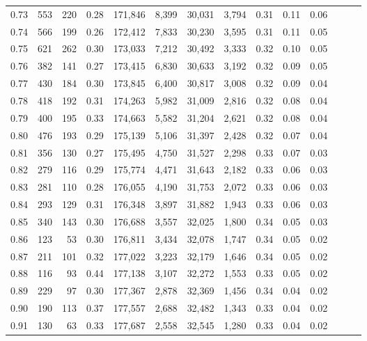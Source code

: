 \begin{tabular}{rrrrrrrrrrrrrr}
0.73 &    553 &  220 &  0.28 &  171,846 &    8,399 &  30,031 &   3,794 &  0.31 &  0.11 &      0.06 \\
0.74 &    566 &  199 &  0.26 &  172,412 &    7,833 &  30,230 &   3,595 &  0.31 &  0.11 &      0.05 \\
0.75 &    621 &  262 &  0.30 &  173,033 &    7,212 &  30,492 &   3,333 &  0.32 &  0.10 &      0.05 \\
0.76 &    382 &  141 &  0.27 &  173,415 &    6,830 &  30,633 &   3,192 &  0.32 &  0.09 &      0.05 \\
0.77 &    430 &  184 &  0.30 &  173,845 &    6,400 &  30,817 &   3,008 &  0.32 &  0.09 &      0.04 \\
0.78 &    418 &  192 &  0.31 &  174,263 &    5,982 &  31,009 &   2,816 &  0.32 &  0.08 &      0.04 \\
0.79 &    400 &  195 &  0.33 &  174,663 &    5,582 &  31,204 &   2,621 &  0.32 &  0.08 &      0.04 \\
0.80 &    476 &  193 &  0.29 &  175,139 &    5,106 &  31,397 &   2,428 &  0.32 &  0.07 &      0.04 \\
0.81 &    356 &  130 &  0.27 &  175,495 &    4,750 &  31,527 &   2,298 &  0.33 &  0.07 &      0.03 \\
0.82 &    279 &  116 &  0.29 &  175,774 &    4,471 &  31,643 &   2,182 &  0.33 &  0.06 &      0.03 \\
0.83 &    281 &  110 &  0.28 &  176,055 &    4,190 &  31,753 &   2,072 &  0.33 &  0.06 &      0.03 \\
0.84 &    293 &  129 &  0.31 &  176,348 &    3,897 &  31,882 &   1,943 &  0.33 &  0.06 &      0.03 \\
0.85 &    340 &  143 &  0.30 &  176,688 &    3,557 &  32,025 &   1,800 &  0.34 &  0.05 &      0.03 \\
0.86 &    123 &   53 &  0.30 &  176,811 &    3,434 &  32,078 &   1,747 &  0.34 &  0.05 &      0.02 \\
0.87 &    211 &  101 &  0.32 &  177,022 &    3,223 &  32,179 &   1,646 &  0.34 &  0.05 &      0.02 \\
0.88 &    116 &   93 &  0.44 &  177,138 &    3,107 &  32,272 &   1,553 &  0.33 &  0.05 &      0.02 \\
0.89 &    229 &   97 &  0.30 &  177,367 &    2,878 &  32,369 &   1,456 &  0.34 &  0.04 &      0.02 \\
0.90 &    190 &  113 &  0.37 &  177,557 &    2,688 &  32,482 &   1,343 &  0.33 &  0.04 &      0.02 \\
0.91 &    130 &   63 &  0.33 &  177,687 &    2,558 &  32,545 &   1,280 &  0.33 &  0.04 &      0.02 \\

\end{tabular}
